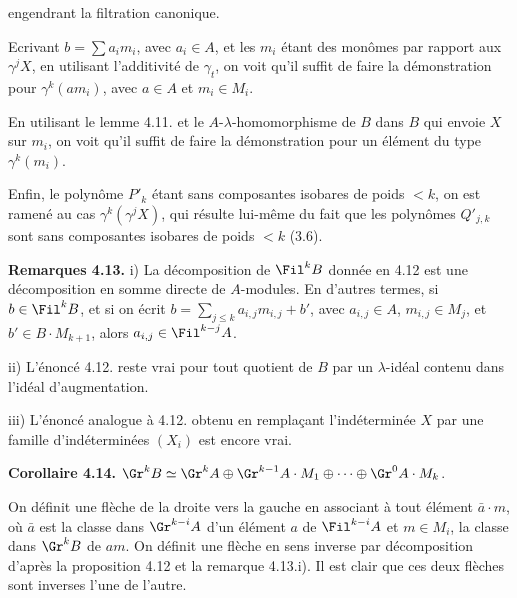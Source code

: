 engendrant la filtration canonique.

Ecrivant \(b=\sum a_i m_i\), avec \(a_i\in A\), et les \(m_i\) étant des monômes par rapport aux \(\gamma^j X\), en utilisant l'additivité de \(\gamma_t\), on voit qu'il suffit de faire la démonstration pour \(\gamma^k(am_i)\), avec \(a\in A\) et \(m_i\in M_i\).

En utilisant le lemme 4.11. et le \(A\)-\(\lambda\)-homomorphisme de \(B\) dans \(B\) qui envoie \(X\) sur \(m_i\), on voit qu'il suffit de faire la démonstration pour un élément du type \(\gamma^k(m_i)\).

Enfin, le polynôme \(P'_k\) étant sans composantes isobares de poids \(<k\), on est ramené au cas \(\gamma^k(\gamma^j X)\), qui résulte lui-même du fait que les polynômes \(Q'_{j,k}\) sont sans composantes isobares de poids \(<k\) (3.6).

\textbf{Remarques 4.13.} i) La décomposition de \(\Fil^k B\) donnée en 4.12 est une décomposition en somme directe de \(A\)-modules. En d'autres termes, si \(b\in\Fil^k B\), et si on écrit \(b=\sum_{j\le k}a_{i,j}m_{i,j}+b'\), avec \(a_{i,j}\in A\), \(m_{i,j}\in M_j\), et \(b'\in B\cdot M_{k+1}\), alors \(a_{i,j}\in\Fil^{k-j}A\).

ii) L'énoncé 4.12. reste vrai pour tout quotient de \(B\) par un \(\lambda\)-idéal contenu dans l'idéal d'augmentation.

iii) L'énoncé analogue à 4.12. obtenu en remplaçant l'indéterminée \(X\) par une famille d'indéterminées \((X_i)\) est encore vrai.

\textbf{Corollaire 4.14.} \(\Gr^k B\simeq\Gr^k A\oplus\Gr^{k-1}A\cdot M_1\oplus\cdots\oplus\Gr^0 A\cdot M_k\).

On définit une flèche de la droite vers la gauche en associant à tout élément \(\bar a\cdot m\), où \(\bar a\) est la classe dans \(\Gr^{k-i}A\) d'un élément \(a\) de \(\Fil^{k-i}A\) et \(m\in M_i\), la classe dans \(\Gr^k B\) de \(am\). On définit une flèche en sens inverse par décomposition d'après la proposition 4.12 et la remarque 4.13.i). Il est clair que ces deux flèches sont inverses l'une de l'autre.

